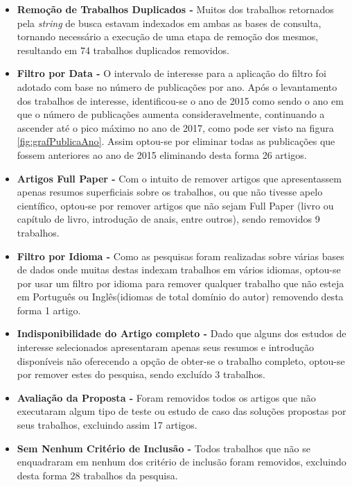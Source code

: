 \documentclass[ti,table]{texufpel} %
\begin{document}
\begin{itemize}
\item  \textbf{Remoção de Trabalhos Duplicados - } Muitos dos trabalhos retornados pela \textit{string} de busca estavam indexados em ambas as bases de consulta, tornando necessário a execução de uma etapa de remoção dos mesmos, resultando em 74 trabalhos duplicados removidos.

\item  \textbf{Filtro por Data - } O intervalo de interesse para a aplicação do filtro foi adotado com base no número de publicações por ano. Após o levantamento dos trabalhos de interesse, identificou-se o ano de 2015 como sendo o ano em que o número de publicações aumenta consideravelmente, continuando a ascender até o pico máximo no ano de 2017, como pode ser visto na figura \ref{fig:grafPublicaAno}. Assim optou-se por eliminar todas as publicações que fossem anteriores ao ano de 2015 eliminando desta forma 26 artigos.	

\item  \textbf{Artigos Full Paper - } Com o intuito de remover artigos que apresentassem apenas resumos superficiais sobre os trabalhos, ou que não tivesse apelo científico, optou-se por remover artigos que não sejam Full Paper (livro ou capítulo de livro, introdução de anais, entre outros), sendo removidos 9 trabalhos.

\item  \textbf{Filtro por Idioma - } Como as pesquisas foram realizadas sobre várias bases de dados onde muitas destas indexam trabalhos em vários idiomas, optou-se por usar um filtro por idioma para remover qualquer trabalho que não esteja em Português ou Inglês(idiomas de total domínio do autor) removendo desta forma 1 artigo.

\item  \textbf{Indisponibilidade do Artigo completo - } Dado que alguns dos estudos de interesse selecionados apresentaram apenas seus resumos e introdução disponíveis não oferecendo a opção de obter-se o trabalho completo, optou-se por remover estes do pesquisa, sendo excluído 3 trabalhos.

\item  \textbf{Avaliação da Proposta - } Foram removidos todos os artigos que não executaram algum tipo de teste ou estudo de caso das soluções propostas por seus trabalhos, excluindo assim 17 artigos.

\item  \textbf{Sem Nenhum Critério de Inclusão - } Todos trabalhos que não  se enquadraram em nenhum dos critério de inclusão foram removidos, excluindo desta forma 28 trabalhos da pesquisa.
	

\end{itemize}
\end{document}

